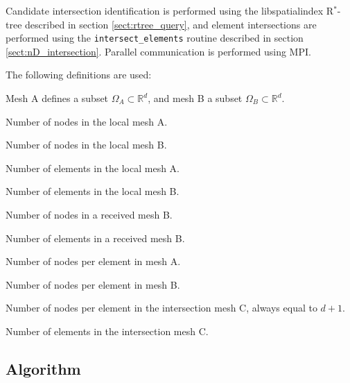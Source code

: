 \documentclass{article}
\begin{document}
Candidate intersection identification is performed using the libspatialindex
R${}^*$-tree described in section \ref{sect:rtree_query}, and element
intersections are performed using the \verb+intersect_elements+ routine
described in section \ref{sect:nD_intersection}. Parallel communication is
performed using MPI.

The following definitions are used:
\begin{description}[leftmargin=\parindent,labelindent=\parindent]
  \item[$d$] Mesh A defines a subset $\Omega_A \subset \mathbb{R}^d$, and mesh B
    a subset $\Omega_B \subset \mathbb{R}^d$.
  \item[$V_A$] Number of nodes in the local mesh A.
  \item[$V_B$] Number of nodes in the local mesh B.
  \item[$E_A$] Number of elements in the local mesh A.
  \item[$E_B$] Number of elements in the local mesh B.
  \item[$V_B^*$] Number of nodes in a received mesh B.
  \item[$E_B^*$] Number of elements in a received mesh B.
  \item[$l_A$] Number of nodes per element in mesh A.
  \item[$l_B$] Number of nodes per element in mesh B.
  \item[$l_C$] Number of nodes per element in the intersection mesh C, always
               equal to $d + 1$.
  \item[$E_C$] Number of elements in the intersection mesh C.
\end{description}

\subsection{Algorithm}
\end{document}
